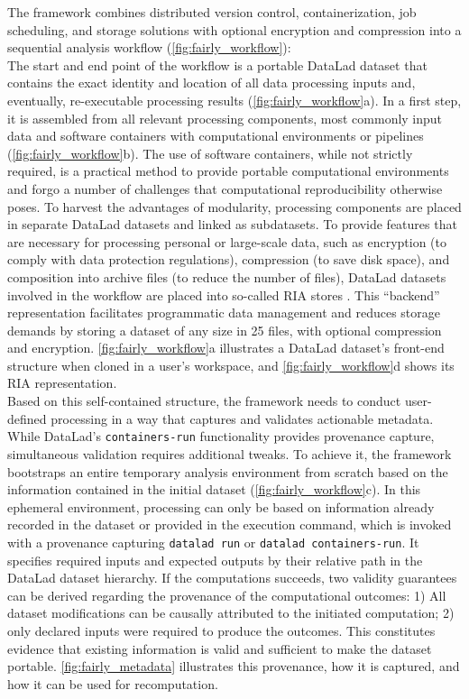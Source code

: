 The framework combines distributed version control, containerization, job scheduling, and storage solutions with optional encryption and compression into a sequential analysis workflow (\cref{fig:fairly_workflow}):\\
The start and end point of the workflow is a portable DataLad dataset that contains the exact identity and location of all data processing inputs and, eventually, re-executable processing results (\cref{fig:fairly_workflow}a).
In a first step, it is assembled from all relevant processing components, most commonly input data and software containers with computational environments or pipelines (\cref{fig:fairly_workflow}b).
The use of software containers, while not strictly required, is a practical method to provide portable computational environments and forgo a number of challenges that computational reproducibility otherwise poses.
To harvest the advantages of modularity, processing components are placed in separate DataLad datasets and linked as subdatasets.
To provide features that are necessary for processing personal or large-scale data, such as encryption (to comply with data protection regulations), compression (to save disk space), and composition into archive files (to reduce the number of files),
DataLad datasets involved in the workflow are placed into so-called RIA stores \citep{poldrackRIA}.
This ``backend'' representation facilitates programmatic data management and reduces storage demands by storing a dataset of any size in 25 files, with optional compression and encryption.
\cref{fig:fairly_workflow}a illustrates a DataLad dataset's front-end structure when cloned in a user's workspace, and \cref{fig:fairly_workflow}d shows its RIA representation.\\
Based on this self-contained structure, the framework needs to conduct user-defined processing in a way that captures and validates actionable metadata.
While DataLad's \texttt{containers-run} functionality provides provenance capture, simultaneous validation requires additional tweaks.
To achieve it, the framework bootstraps an entire temporary analysis environment from scratch based on the information contained in the initial dataset (\cref{fig:fairly_workflow}c).
In this ephemeral environment, processing can only be based on information already recorded in the dataset or provided in the execution command, which is invoked with a provenance capturing \texttt{datalad run} or \texttt{datalad containers-run}.
It specifies required inputs and expected outputs by their relative path in the DataLad dataset hierarchy.
If the computations succeeds, two validity guarantees can be derived regarding the provenance of the computational outcomes: 1) All dataset modifications can be causally attributed to the initiated computation; 2) only declared inputs were required to produce the outcomes.
This constitutes evidence that existing information is valid and sufficient to make the dataset portable.
\cref{fig:fairly_metadata} illustrates this provenance, how it is captured, and how it can be used for recomputation.\\


